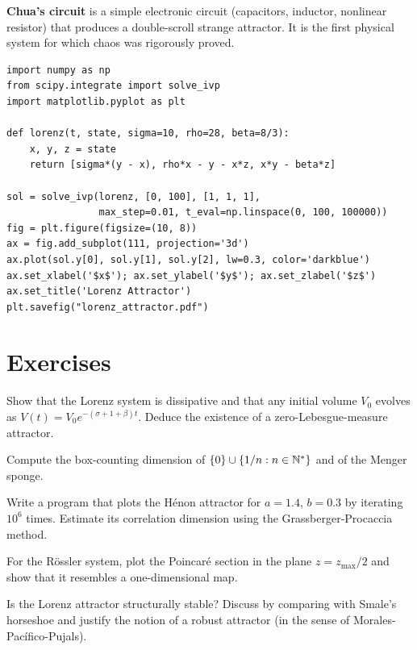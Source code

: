 \begin{example}
\textbf{Chua's circuit} is a simple electronic circuit (capacitors, inductor,
nonlinear resistor) that produces a double-scroll strange attractor. It is the
first physical system for which chaos was rigorously proved.
\end{example}

\begin{codeblock}[title=\textbf{Visualising the Lorenz attractor}]
\begin{verbatim}
import numpy as np
from scipy.integrate import solve_ivp
import matplotlib.pyplot as plt

def lorenz(t, state, sigma=10, rho=28, beta=8/3):
    x, y, z = state
    return [sigma*(y - x), rho*x - y - x*z, x*y - beta*z]

sol = solve_ivp(lorenz, [0, 100], [1, 1, 1],
                max_step=0.01, t_eval=np.linspace(0, 100, 100000))
fig = plt.figure(figsize=(10, 8))
ax = fig.add_subplot(111, projection='3d')
ax.plot(sol.y[0], sol.y[1], sol.y[2], lw=0.3, color='darkblue')
ax.set_xlabel('$x$'); ax.set_ylabel('$y$'); ax.set_zlabel('$z$')
ax.set_title('Lorenz Attractor')
plt.savefig("lorenz_attractor.pdf")
\end{verbatim}
\end{codeblock}

\section{Exercises}

\begin{exercise}[Dissipativity]
Show that the Lorenz system is dissipative and that any initial volume $V_0$
evolves as $V(t) = V_0 e^{-(\sigma + 1 + \beta)t}$. Deduce the existence
of a zero-Lebesgue-measure attractor.
\end{exercise}

\begin{exercise}
Compute the box-counting dimension of $\{0\} \cup \{1/n : n \in \mathbb{N}^*\}$
and of the Menger sponge.
\end{exercise}

\begin{exercise}
Write a program that plots the H\'enon attractor for $a = 1.4$, $b = 0.3$
by iterating $10^6$ times. Estimate its correlation dimension using the
Grassberger-Procaccia method.
\end{exercise}

\begin{exercise}
For the R\"ossler system, plot the Poincar\'e section in the plane
$z = z_{\max}/2$ and show that it resembles a one-dimensional map.
\end{exercise}

\begin{exercise}
Is the Lorenz attractor structurally stable? Discuss by comparing with
Smale's horseshoe and justify the notion of a robust attractor (in the sense
of Morales-Pac\'ifico-Pujals).
\end{exercise}
